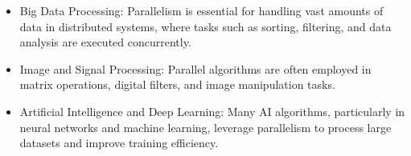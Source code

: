 \documentclass[a4paper, 10pt]{book}
\begin{document}
\begin{enumerate}
\begin{itemize}
                    \item {\bold Big Data Processing:} Parallelism is essential for handling vast amounts of data in distributed systems, where tasks such as sorting, filtering, and data analysis are executed concurrently.

                    \item {\bold Image and Signal Processing:} Parallel algorithms are often employed in matrix operations, digital filters, and image manipulation tasks.

                    \item {\bold Artificial Intelligence and Deep Learning:} Many AI algorithms, particularly in neural networks and machine learning, leverage parallelism to process large datasets and improve training efficiency.

                \end{itemize}
        
        \end{enumerate}
\end{document}
